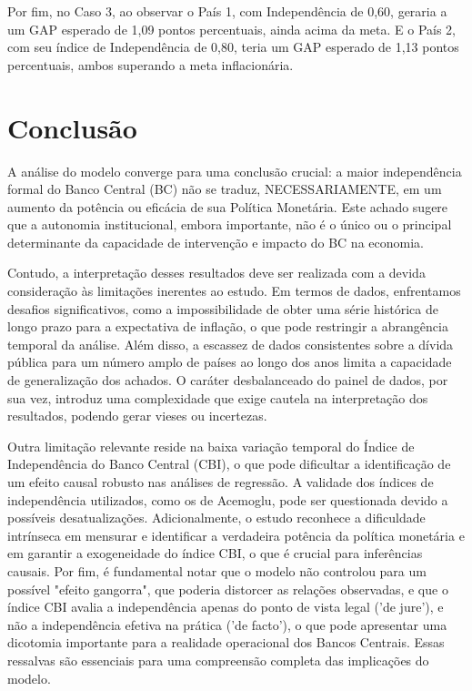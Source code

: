\documentclass[a4paper,12pt]{article}
\begin{document}
Por fim, no Caso 3, ao observar o País 1, com Independência de 0,60, geraria a um GAP esperado de 1,09 pontos percentuais, ainda acima da meta. E o País 2, com seu índice de Independência de 0,80, teria um GAP esperado de 1,13 pontos percentuais, ambos superando a meta inflacionária.


\section*{\textbf{Conclusão}}

A análise do modelo converge para uma conclusão crucial: a maior independência formal do Banco Central (BC) não se traduz, NECESSARIAMENTE, em um aumento da potência ou eficácia de sua Política Monetária. Este achado sugere que a autonomia institucional, embora importante, não é o único ou o principal determinante da capacidade de intervenção e impacto do BC na economia.

Contudo, a interpretação desses resultados deve ser realizada com a devida consideração às limitações inerentes ao estudo. Em termos de dados, enfrentamos desafios significativos, como a impossibilidade de obter uma série histórica de longo prazo para a expectativa de inflação, o que pode restringir a abrangência temporal da análise. Além disso, a escassez de dados consistentes sobre a dívida pública para um número amplo de países ao longo dos anos limita a capacidade de generalização dos achados. O caráter desbalanceado do painel de dados, por sua vez, introduz uma complexidade que exige cautela na interpretação dos resultados, podendo gerar vieses ou incertezas.

Outra limitação relevante reside na baixa variação temporal do Índice de Independência do Banco Central (CBI), o que pode dificultar a identificação de um efeito causal robusto nas análises de regressão. A validade dos índices de independência utilizados, como os de Acemoglu, pode ser questionada devido a possíveis desatualizações. Adicionalmente, o estudo reconhece a dificuldade intrínseca em mensurar e identificar a verdadeira potência da política monetária e em garantir a exogeneidade do índice CBI, o que é crucial para inferências causais. Por fim, é fundamental notar que o modelo não controlou para um possível "efeito gangorra", que poderia distorcer as relações observadas, e que o índice CBI avalia a independência apenas do ponto de vista legal ('de jure'), e não a independência efetiva na prática ('de facto'), o que pode apresentar uma dicotomia importante para a realidade operacional dos Bancos Centrais. Essas ressalvas são essenciais para uma compreensão completa das implicações do modelo.
\end{document}
